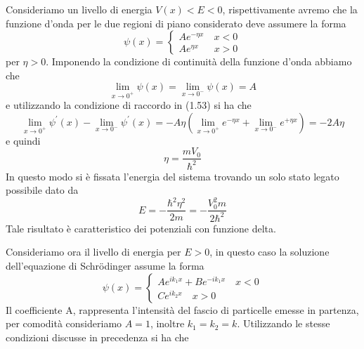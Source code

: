 \noindent Consideriamo un livello di energia $V(x)<E<0$, rispettivamente avremo che la funzione d'onda per le due regioni di piano considerato deve assumere la forma 
\begin{equation}
	\psi(x) = \begin{cases}
		Ae^{-\eta x} \quad x < 0 \\
		Ae^{\eta x} \quad \;\; x > 0
	\end{cases}
\end{equation}
per $\eta >0$. Imponendo la condizione di continuit\`a della funzione d'onda abbiamo che 
\begin{equation*}
	\lim_{x \to 0^+} \psi(x) = \lim_{x \to 0^{-}}\psi(x) = A
\end{equation*}
e utilizzando la condizione di raccordo in (1.53) si ha che 
\begin{equation*}
\lim _{x \rightarrow 0^{+}} \psi^{\prime}(x)-\lim _{x \rightarrow 0^{-}} \psi^{\prime}(x)=-A \eta\left(\lim _{x \rightarrow 0^{+}} e^{-\eta x}+\lim _{x \rightarrow 0^{-}} e^{+\eta x}\right)=-2 A \eta
\end{equation*}
e quindi
\begin{equation*}
	\eta = \frac{mV_0}{\hbar^2}
\end{equation*}
In questo modo si \`e fissata l'energia del sistema trovando un solo stato legato possibile dato da
\begin{equation*}
	E=-\frac{\hbar^2 \eta^2}{2 m}=-\frac{V_0^2 m}{2 \hbar^2}
\end{equation*}
Tale risultato \`e caratteristico dei potenziali con funzione delta.
\newline

\noindent Consideriamo ora il livello di energia per $E > 0 $, in questo caso la soluzione dell'equazione di Schr\"odinger assume la forma 
\begin{equation}
	\psi(x) = \begin{cases}
 Ae^{ik_1 x} + Be^{-ik_1 x} \quad x < 0 \\
 C e^{ik_2x} \quad x>0	
 \end{cases}
\end{equation}
Il coefficiente A, rappresenta l'intensit\`a del fascio di particelle emesse in partenza, per comodit\`a consideriamo $A = 1$, inoltre $k_1 =k_2 = k$. Utilizzando le stesse condizioni discusse in precedenza si ha che 
\newpage

